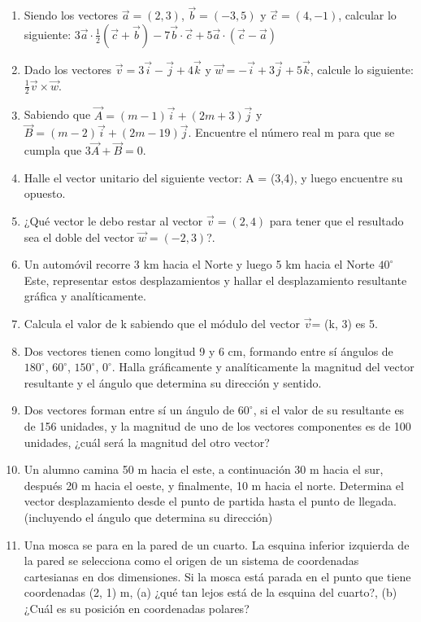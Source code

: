 \begin{enumerate}
\item Siendo los vectores $\vec{a} = (2,3)$, $\vec{b} = (-3,5)$ y $\vec{c} = (4,-1)$, calcular lo siguiente: 
$3\vec{a}\cdot\frac{1}{2}(\vec{c}+\vec{b})-7\vec{b}\cdot\vec{c}+5\vec{a}\cdot(\vec{c}-\vec{a})$ 

\item Dado los vectores $\vec{v} = 3\vec{i}-\vec{j}+4\vec{k}$ y $\vec{w}=-\vec{i}+3\vec{j}+5\vec{k}$, calcule lo 
siguiente: $\frac{1}{2}\vec{v}\times\vec{w}$.

\item Sabiendo que $\vec{A} = (m - 1) \vec{i} + (2 m + 3) \vec{j}$ y $\vec{B} = (m - 2) \vec{i} + (2 m - 19) \vec{j}$. 
Encuentre el número real m para que se cumpla que $3 \vec{A} + \vec{B} = 0$.

\item Halle el vector unitario del siguiente vector: A = (3,4), y luego encuentre su opuesto.

\item ¿Qué vector le debo restar al vector $\vec{v} = (2,4)$ para tener que el resultado sea el doble del vector $\vec{w} = 
(-2,3)$?.

\item Un automóvil recorre 3 km hacia el Norte y luego 5 km hacia el Norte $40^\circ$ Este, representar estos desplazamientos y 
hallar el desplazamiento resultante gráfica y analíticamente.

\item Calcula el valor de k sabiendo que el módulo del vector $\vec{v}$= (k, 3) es 5.

\item Dos vectores tienen como longitud 9 y 6 cm, formando entre sí ángulos de $180^\circ$, $60^\circ$, $150^\circ$, $0^\circ$. 
Halla gráficamente y analíticamente la magnitud del vector resultante y el ángulo que determina su dirección y sentido.

\item Dos vectores forman entre sí un ángulo de $60^\circ$, si el valor de su resultante es de 156 unidades, y la magnitud de uno 
de los vectores componentes es de 100 unidades, ¿cuál será la magnitud del otro vector?

\item Un alumno camina 50 m hacia el este, a continuación 30 m hacia el sur, después 20 m hacia el oeste, y finalmente, 10 m 
hacia el norte. Determina el vector desplazamiento desde el punto de partida hasta el punto de llegada. (incluyendo el ángulo que 
determina su dirección)

\item Una mosca se para en la pared de un cuarto. La esquina inferior izquierda de la pared se selecciona como el origen de un 
sistema de coordenadas cartesianas en dos dimensiones. Si la mosca está parada en el punto que tiene coordenadas (2, 1) m, (a) 
¿qué tan lejos está de la esquina del cuarto?, (b) ¿Cuál es su posición en coordenadas polares?

\end{enumerate}
